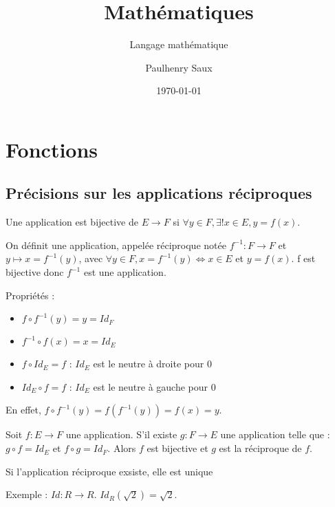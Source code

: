 \documentclass[french]{yLectureNote}
\title{Mathématiques}
\subtitle{Langage mathématique}
\author{Paulhenry Saux}
\date{\today}
\begin{document}
\setcounter{chapter}{2}

	\chapter{Fonctions}
\section{Précisions sur les applications réciproques}
Une application est bijective de $E\rightarrow F$ si $\forall y\in F, \exists!x\in E,y=f(x)$.

On définit une application, appelée réciproque notée $f^{-1} : F\rightarrow F$ et $y\longmapsto x=f^{-1}(y)$, avec $\forall y\in F, x=f^{-1}(y) \iff x\in E$ et $y = f(x)$. f est bijective donc $f^{-1}$ est une application.

Propriétés :
\begin{itemize}
 \item $f\circ f^{-1}(y) = y = Id_F$
  \item $f^{-1}\circ f(x) = x = Id_E$
  \item $f\circ Id_E = f$ : $Id_E$ est le neutre à droite pour 0
  \item $Id_E \circ f = f$ : $Id_E$ est le neutre à gauche pour 0
\end{itemize}
En effet, $f\circ f^{-1}(y) = f(f^{-1}(y)) = f(x) = y$.

\begin{theorem}[Proposition]
Soit $f : E\rightarrow F$ une application. S'il existe $g : F\rightarrow E$ une application telle que : $g\circ f = Id_E$ et $ f\circ g = Id_F$. Alors $f$ est bijective et $g$ est la réciproque de $f$.
\end{theorem}
\begin{theorem}[Corrolaire]
Si l'application réciproque exsiste, elle est unique
\end{theorem}
Exemple : $Id : R\rightarrow R$. $Id_R (\sqrt{2}) = \sqrt{2}$.
\end{document}
